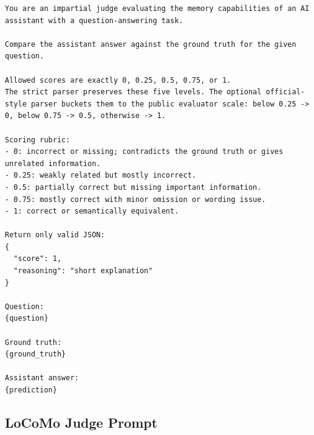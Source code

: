 \begin{lstlisting}[style=promptstyle]
You are an impartial judge evaluating the memory capabilities of an AI assistant with a question-answering task.

Compare the assistant answer against the ground truth for the given question.

Allowed scores are exactly 0, 0.25, 0.5, 0.75, or 1.
The strict parser preserves these five levels. The optional official-style parser buckets them to the public evaluator scale: below 0.25 -> 0, below 0.75 -> 0.5, otherwise -> 1.

Scoring rubric:
- 0: incorrect or missing; contradicts the ground truth or gives unrelated information.
- 0.25: weakly related but mostly incorrect.
- 0.5: partially correct but missing important information.
- 0.75: mostly correct with minor omission or wording issue.
- 1: correct or semantically equivalent.

Return only valid JSON:
{
  "score": 1,
  "reasoning": "short explanation"
}

Question:
{question}

Ground truth:
{ground_truth}

Assistant answer:
{prediction}
\end{lstlisting}

\subsection{LoCoMo Judge Prompt}
\label{app:judge_locomo}


